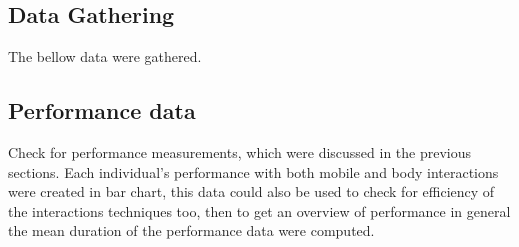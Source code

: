 \subsection{Data Gathering }
The bellow data were gathered.

\subsection{Performance data}
Check for performance measurements, which were discussed in the previous sections. Each individual's performance with both mobile and body interactions were created in bar chart, this data could also be used to check for efficiency of the interactions techniques too, then to get an overview of performance in general the mean duration of the performance data were computed.


